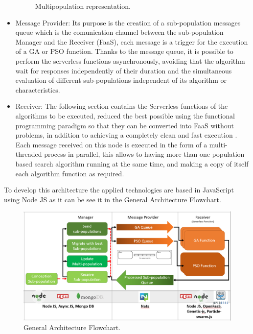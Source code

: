 \documentclass[runningheads]{llncs}
\begin{document}
\begin{itemize}
\begin{figure}[htp]
  \caption{Multipopulation representation.} \label{fig1}
  \end{figure}
\item Message Provider: Its purpose is the creation of a sub-population messages queue which is the 
comunication channel between the sub-population Manager and the Receiver (FaaS), each message is a 
trigger for the execution of a GA or PSO function. Thanks to the message queue, it is possible to perform 
the serverless functions asynchronously, avoiding that the algorithm wait for responses independently of 
their duration and the simultaneous evaluation of different sub-populations independent of its algorithm 
or characteristics.
\item Receiver: The following section contains the Serverless functions of the algorithms to be executed, 
reduced the best possible using the functional programming paradigm so that they can be converted into FaaS 
without problems, in addition to achieving a completely clean and fast execution \cite{Roberts2016} . Each message received 
on this node is executed in the form of a multi-threaded process in parallel, this allows to having more than 
one population-based search algorithm running at the same time, and making a copy of itself each algorithm 
function as required.
\end{itemize}



To develop this architecture the applied technologies are based in JavaScript using Node JS as it can be
see it in the General Architecture Flowchart.

\begin{figure}[htp]
  \includegraphics[width=\textwidth]{general diagram architecture 2.png}
  \caption{General Architecture Flowchart.} \label{fig1}
  \end{figure}
\end{document}
